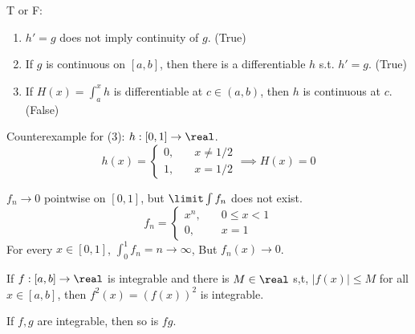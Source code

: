 \documentclass[11pt]{article}
\begin{document}
\example
T or F:
\begin{enumerate}
	\item $h' = g$ does not imply continuity of $g$. (True)
	\item If $g$ is continuous on $[a,b]$, then there is a differentiable $h$ s.t. $h' = g$. (True)
	\item If $H(x) = \int_a^x h$ is differentiable at $c \in (a,b)$, then $h$ is continuous at $c$. (False)
\end{enumerate}
Counterexample for (3): $h: [0,1] \rightarrow \real$.
$$h(x) = \begin{cases}
	0, \quad &x \neq 1/2\\
	1, \quad &x = 1/2
\end{cases} \implies H(x) = 0$$

\example
$f_n \rightarrow 0$ pointwise on $[0,1]$, but $\limit \int f_n$ does not exist.
$$f_n = \begin{cases}
	x^n, \quad &0 \leq x < 1\\
	0, \quad  & x = 1
\end{cases}$$
For every $x \in [0,1]$,
$\int_0^1 f_n = n \rightarrow \infty$,
But $f_n(x) \rightarrow 0$.


\fact
If $f:[a,b] \rightarrow \real$ is integrable and there is $M \in \real$ s,t, $|f(x)| \leq M$ for all $x \in [a,b]$, then $f^2(x) = \left( f(x) \right)^2$ is integrable.

\fact
If $f, g$ are integrable, then so is $fg$.

\end{document}
